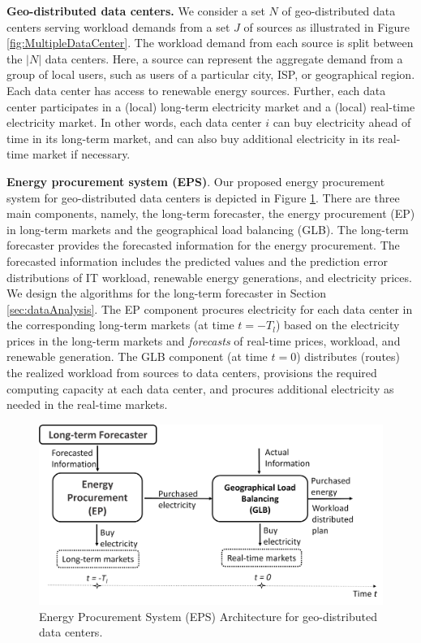 \textbf{Geo-distributed data centers.} We consider a set $N$ of geo-distributed data centers serving workload demands from a set $J$ of sources as illustrated in Figure \ref{fig:MultipleDataCenter}. The workload demand from each source is split between the $|N|$ data centers. Here, a source can represent the aggregate demand from a group of local users, such as users of a particular city, ISP, or geographical region. Each data center has access to renewable energy sources. Further, each data center participates in a (local) long-term electricity market and a (local) real-time electricity market. In other words, each data center $i$ can buy electricity ahead of time in its long-term market, and can also buy additional electricity in its real-time market if necessary. %

\textbf{Energy procurement system (EPS)}. Our proposed energy
procurement system for geo-distributed data centers is depicted in
Figure \ref{fig:SystemArchitecture}. There are three main components,
namely, the long-term forecaster, the energy procurement
(EP) in long-term markets and the geographical load balancing (GLB). The long-term forecaster provides the forecasted
information for the energy procurement. The forecasted information
includes the predicted values and the prediction error distributions
of IT workload, renewable energy generations, and electricity
prices. We design the algorithms for the long-term forecaster in
Section \ref{sec:dataAnalysis}. The EP component procures electricity
for each data center in the corresponding long-term markets (at time
$t = -T_l$) based on the electricity prices in the long-term markets
and \emph{forecasts} of real-time prices, workload, and renewable
generation. The GLB component (at time $t = 0$) distributes (routes)
the realized workload from sources to data centers, provisions the
required computing capacity at each data center, and procures
additional electricity as needed in the real-time markets.

\begin{figure}[!t]
	\centering
	\includegraphics[width=1.0\linewidth]{figs/SystemArchitecture}
	\caption{Energy Procurement System (EPS) Architecture for geo-distributed data centers.}
	\label{fig:SystemArchitecture}
\end{figure}

